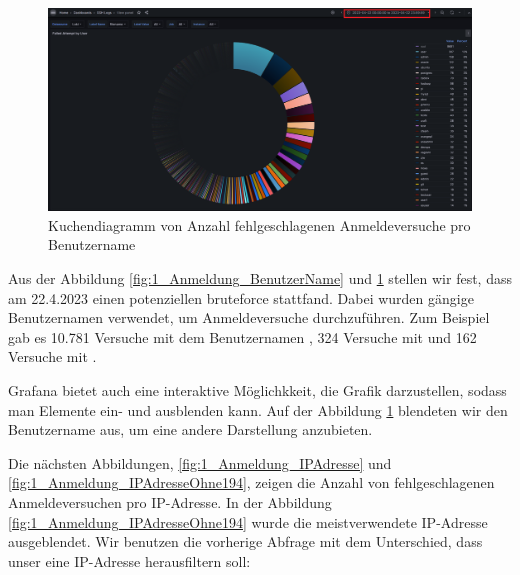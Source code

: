 \newpage
{}
\thispagestyle{lscape}
\begin{landscape}
    \begin{figure}[H]
        \centerline{\includegraphics[width=1.7\textwidth]{assets/Failed_pro_user2.png}}
        \caption[Kuchendiagramm von Anzahl fehlgeschlagenen Anmeldeversuche pro Benutzername]
        {Kuchendiagramm von Anzahl fehlgeschlagenen Anmeldeversuche pro Benutzername}
        \label{fig:1_Anmeldung_BenutzerNameOhneRoot}
        \centering
    \end{figure}
\end{landscape}
\restoregeometry

Aus der Abbildung \ref{fig:1_Anmeldung_BenutzerName} und \ref{fig:1_Anmeldung_BenutzerNameOhneRoot} stellen wir fest, dass am 22.4.2023 einen potenziellen \gls{bruteforce} stattfand. Dabei wurden gängige Benutzernamen verwendet, um Anmeldeversuche durchzuführen. Zum Beispiel gab es 10.781 Versuche mit dem Benutzernamen , 324 Versuche mit  und 162 Versuche mit . 

Grafana bietet auch eine interaktive Möglichkkeit, die Grafik darzustellen, sodass man Elemente ein- und ausblenden kann. Auf der Abbildung \ref{fig:1_Anmeldung_BenutzerNameOhneRoot} blendeten wir den Benutzername  aus, um eine andere Darstellung anzubieten.

Die nächsten Abbildungen, \ref{fig:1_Anmeldung_IPAdresse} und \ref{fig:1_Anmeldung_IPAdresseOhne194}, zeigen die Anzahl von fehlgeschlagenen Anmeldeversuchen pro IP-Adresse. In der Abbildung \ref{fig:1_Anmeldung_IPAdresseOhne194} wurde die meistverwendete IP-Adresse ausgeblendet. Wir benutzen die vorherige Abfrage mit dem Unterschied, dass unser \textcolor{blue}{} eine IP-Adresse herausfiltern soll:

